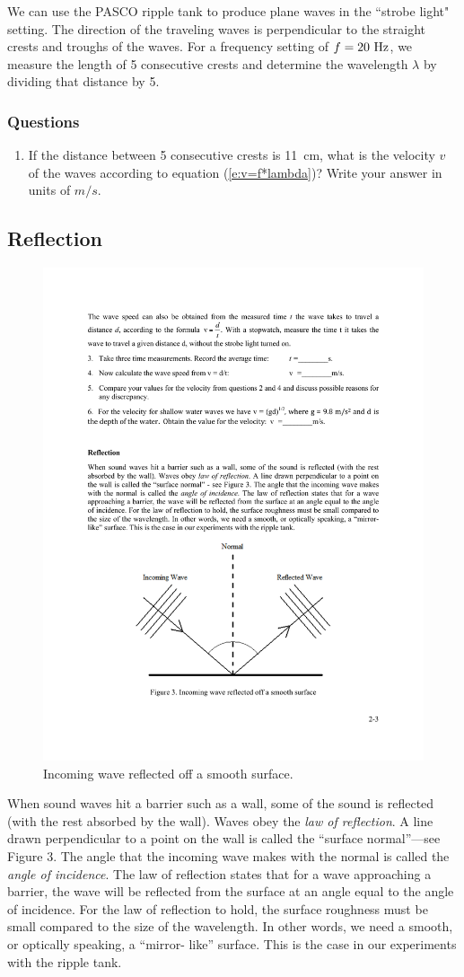 \documentclass[11pt]{NSF}
\def\ben{\begin{enumerate}}
\def\een{\end{enumerate}}
\def\i{\item{}}
\begin{document}
We can use the PASCO ripple tank to produce plane waves in the ``strobe
light" setting.
The direction of the traveling waves is perpendicular to the straight
crests and troughs of the waves.
For a frequency setting of $f=20~{\rm Hz}$, we measure the
length of 5 consecutive crests and determine the wavelength $\lambda$
by dividing that distance by 5.

\subsubsection*{Questions}
\ben

\i 
If the distance between 5 consecutive crests is 11~cm, what is the 
velocity $v$ of the waves according to equation (\ref{e:v=f*lambda})?
Write your answer in units of $m/s$.
\een

\subsection{Reflection}
%
\begin{figure}[hbtp]
\begin{center}
\includegraphics[width=.6\textwidth]{fig2_3}
\caption{Incoming wave reflected off a smooth surface.}
\label{f:3}
\end{center}
\end{figure}
%
When sound waves hit a barrier such as a wall, some of the sound is reflected
(with the rest absorbed by the wall). 
Waves obey the {\em law of reflection}. 
A line
drawn perpendicular to a point on the wall is called the ``surface normal”---see
Figure 3. The angle that the incoming wave makes with the normal is called the
{\em angle of incidence}. The law of reflection states that for a wave approaching a
barrier, the wave will be reflected from the surface at an angle equal to the
angle of incidence. For the law of reflection to hold, the surface roughness
must be small compared to the size of the wavelength. In other words, we need a
smooth, or optically speaking, a ``mirror- like” surface. This is the case in
our experiments with the ripple tank.
\end{document}
